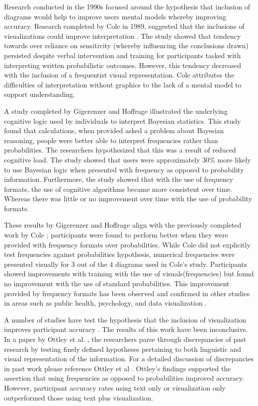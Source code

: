 Research conducted in the 1990s focused around the hypothesis that inclusion
of diagrams would help to improve users mental models whereby improving
accuracy. Research completed by Cole in 1989, suggested that the
inclusions of visualizations could improve interpretation \cite{Cole1989}. The study showed
that tendency towards over reliance on sensitivity (whereby influencing the
conclusions drawn) persisted despite verbal intervention and
training for participants tasked with interpreting written probabilistic
outcomes. However, this tendency decreased with the inclusion of a
frequentist visual representation. Cole attributes the difficulties of
interpretation without graphics to the lack of a mental model to support
understanding.

A study completed by Gigerenzer and Hoffrage \cite{Gigerenzer1995} illustrated the
underlying cognitive logic used by individuals to interpret Bayesian
statistics. This study found that calculations, when provided asked a problem about Bayesian reasoning, people were better able to interpret frequencies rather than probabilities. The researchers
hypothesized that this was a result of reduced cognitive load. The study showed that users were
approximately 30\% more likely to use Bayesian logic when presented with
frequency as opposed to probability information. Furthermore, the study
showed that with the use of frequency formats, the use of cognitive
algorithms became more consistent over time. Whereas there was little or no
improvement over time with the use of probability formats.

These results by Gigerenzer and Hoffrage \cite{Gigerenzer1995} align with the
previously completed work by Cole \cite{Cole1989}; participants were found to
perform better when they were provided with frequency formats over
probabilities. While Cole did not explicitly test frequencies against
probabilities hypothesis, numerical frequencies were presented visually for 3
out of the 4 diagrams used in Cole’s study. Participants showed improvements
with training with the use of visuals(frequencies) but found no improvement
with the use of standard probabilities. This improvement provided by frequency formats has been observed and confirmed in other studies in areas such as public health, psychology, and data visualization \cite{Eddy1982, Galesic2009, Cohen2007, Brown2014, Brase2009}. 

A number of studies have test the hypothesis that the inclusion of
visualization improves participant accuracy \cite{Brown2014, Friederichs2014,
Cohen2007}. The results of this work have been inconclusive. In a paper by
Ottley et al. \cite{Ottley2016}, the researchers parse through discrepancies
of past research by testing finely defined hypotheses pertaining to both
linguistic and visual representation of the information. For a detailed
discussion of discrepancies in past work please reference Ottley et al \cite{Ottley2016}.
Ottley’s findings supported the assertion that using frequencies as opposed to
probabilities improved accuracy. However, participant accuracy rates using
text only or visualization only outperformed those using text plus
visualization.

